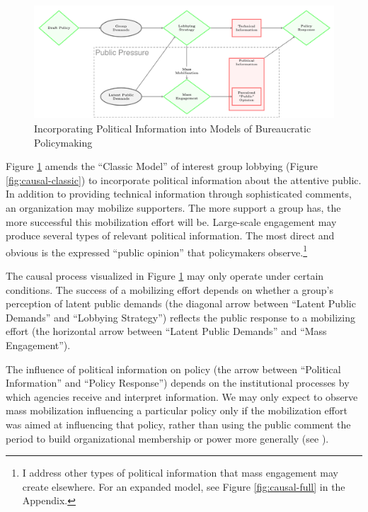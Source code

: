\documentclass[
      12pt,
        ]{article}
\begin{document}
\begin{figure}

{\centering \includegraphics[width=6.5in]{../Figs/causal-whymail} 

}

\caption{Incorporating Political Information into Models of Bureaucratic Policymaking}\label{fig:causal-whymail}
\end{figure}

Figure \ref{fig:causal-whymail} amends the ``Classic Model'' of interest
group lobbying (Figure \ref{fig:causal-classic}) to incorporate political information about the attentive public. In addition to providing technical information through sophisticated comments, an organization may mobilize supporters.
The more support a group has, the more successful this mobilization effort will be.
Large-scale engagement may produce several types of relevant political
information. The most direct and obvious is the expressed ``public
opinion'' that policymakers observe.\footnote{I address other types of political information that mass engagement may create elsewhere. For an expanded model, see Figure
  \ref{fig:causal-full} in the Appendix.}

The causal process visualized in Figure
\ref{fig:causal-whymail} may only operate under certain conditions. The success of a mobilizing effort depends on whether a group's perception of latent public demands (the diagonal arrow between ``Latent Public Demands'' and ``Lobbying Strategy'') reflects the public response to a mobilizing effort (the horizontal arrow between ``Latent Public Demands'' and ``Mass Engagement'').

The influence of political information on policy (the arrow between ``Political Information'' and ``Policy Response'') depends on the institutional processes by which agencies receive and interpret information. We may only expect to observe mass mobilization influencing a particular policy only if the mobilization effort was aimed at influencing that policy, rather than using the public comment the period to build organizational membership or power more generally (see \citet{Carpenter2014b}).
\end{document}
